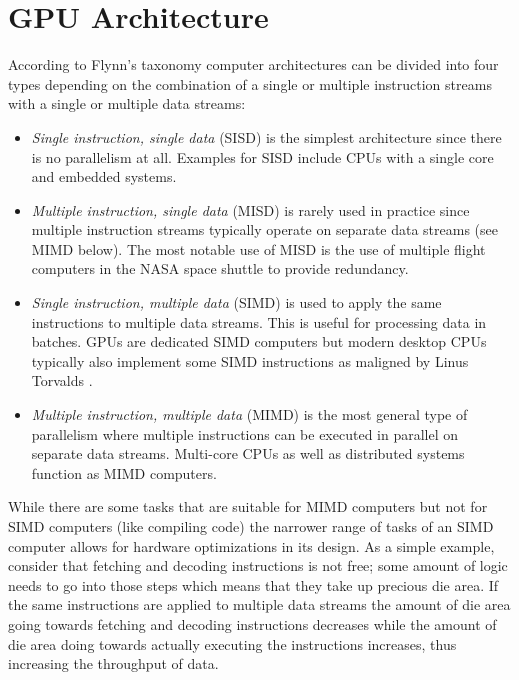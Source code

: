 \section{GPU Architecture}
According to Flynn's taxonomy\cite{flynntax} computer architectures can be divided into
four types depending on the combination of a single or multiple instruction streams
with a single or multiple data streams:
\begin{itemize}
	\item{\textit{Single instruction, single data} (SISD)}
		is the simplest architecture since there is no parallelism at all.
		Examples for SISD include CPUs with a single core and embedded systems.
	\item{\textit{Multiple instruction, single data} (MISD)}
		is rarely used in practice since multiple instruction streams typically operate on separate data streams (see MIMD below).
		The most notable use of MISD is the use of multiple flight computers in the NASA space shuttle to provide redundancy.
	\item{\textit{Single instruction, multiple data} (SIMD)}
		is used to apply the same instructions to multiple data streams.
		This is useful for processing data in batches.
		GPUs are dedicated SIMD computers but modern desktop CPUs typically also
		implement some SIMD instructions as maligned by Linus Torvalds \cite{axv512}.
	\item{\textit{Multiple instruction, multiple data} (MIMD)}
		is the most general type of parallelism where multiple instructions can be executed
		in parallel on separate data streams.
		Multi-core CPUs as well as distributed systems function as MIMD computers.
\end{itemize}
While there are some tasks that are suitable for MIMD computers but not for SIMD computers (like compiling code)
the narrower range of tasks of an SIMD computer allows for hardware optimizations in its design.
As a simple example, consider that fetching and decoding instructions is not free;
some amount of logic needs to go into those steps which means that they take up precious die area.
If the same instructions are applied to multiple data streams
the amount of die area going towards fetching and decoding instructions decreases
while the amount of die area doing towards actually executing the instructions increases, thus increasing the throughput of data.

